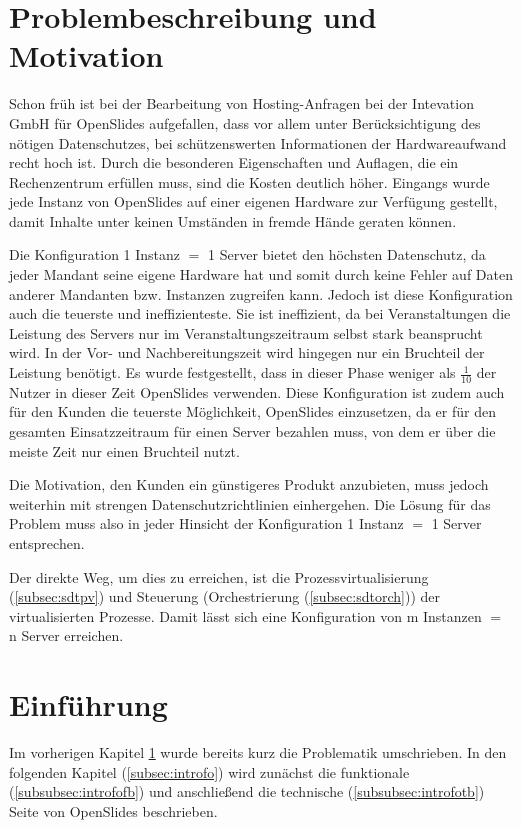 \documentclass[11pt,a4paper]{article}
\begin{document}
\section{Problembeschreibung und Motivation}
\label{sec:pum}
Schon früh ist bei der Bearbeitung von Hosting-Anfragen bei der Intevation GmbH 
für \mbox{OpenSlides} aufgefallen, dass vor allem unter Berücksichtigung des 
nötigen Datenschutzes, bei schützenswerten Informationen\cite{persBezDat} der 
Hardwareaufwand recht hoch ist. Durch die besonderen Eigenschaften und Auflagen,
die ein Rechenzentrum erfüllen muss, sind die Kosten deutlich höher. Eingangs 
wurde jede Instanz von OpenSlides auf einer eigenen Hardware zur Verfügung 
gestellt, damit Inhalte unter keinen Umständen in fremde Hände geraten können.

Die Konfiguration \glqq{}1 Instanz $=$ 1 Server\grqq{} bietet den höchsten 
Datenschutz, da jeder Mandant seine eigene Hardware hat und somit durch keine 
Fehler auf Daten anderer Mandanten bzw. Instanzen zugreifen kann. Jedoch ist 
diese Konfiguration auch die teuerste und ineffizienteste. Sie ist ineffizient, 
da bei Veranstaltungen die Leistung des Servers nur im Veranstaltungszeitraum 
selbst stark beansprucht wird. In der Vor- und Nachbereitungszeit wird hingegen 
nur ein Bruchteil der Leistung benötigt. Es wurde festgestellt, dass in dieser 
Phase weniger als $\frac{1}{10}$ der Nutzer in dieser Zeit OpenSlides 
verwenden. Diese Konfiguration ist zudem auch für den Kunden die teuerste 
Möglichkeit, OpenSlides einzusetzen, da er für den gesamten Einsatzzeitraum für 
einen Server bezahlen muss, von dem er über die meiste Zeit nur einen Bruchteil 
nutzt.

Die Motivation, den Kunden ein günstigeres Produkt anzubieten, muss jedoch 
weiterhin mit strengen Datenschutzrichtlinien einhergehen. Die Lösung für das 
Problem muss also in jeder Hinsicht der Konfiguration \glqq{}1 Instanz $=$ 1 
Server\grqq{} entsprechen.

Der direkte Weg, um dies zu erreichen, ist die Prozessvirtualisierung 
(\ref{subsec:sdtpv}) und Steuerung (Orchestrierung (\ref{subsec:sdtorch})) der 
virtualisierten Prozesse. Damit lässt sich eine Konfiguration von \glqq{}m 
Instanzen $=$ n Server\grqq{} erreichen.
\newpage
\section{Einführung}
\label{sec:einf}
Im vorherigen Kapitel \ref{sec:pum} wurde bereits kurz die Problematik 
umschrieben. In den folgenden Kapitel (\ref{subsec:introfo}) wird zunächst die 
funktionale (\ref{subsubsec:introfofb}) und anschließend die technische 
(\ref{subsubsec:introfotb}) Seite von OpenSlides beschrieben.
\end{document}
